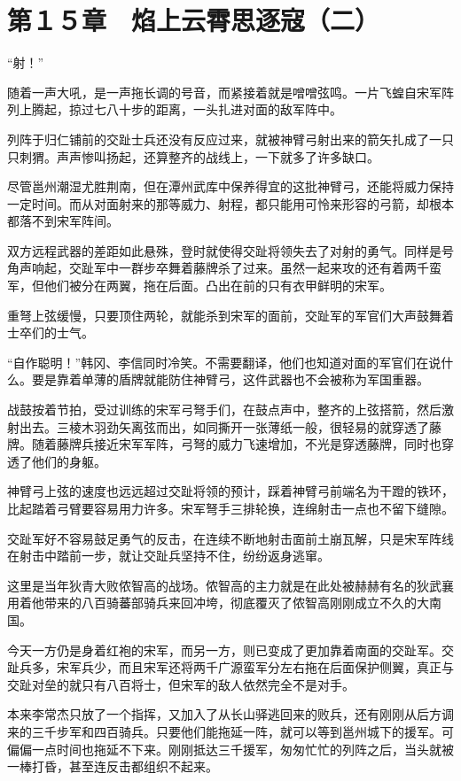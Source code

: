 \section{第１５章　焰上云霄思逐寇（二）}

“射！”

随着一声大吼，是一声拖长调的号音，而紧接着就是噌噌弦鸣。一片飞蝗自宋军阵列上腾起，掠过七八十步的距离，一头扎进对面的敌军阵中。

列阵于归仁铺前的交趾士兵还没有反应过来，就被神臂弓射出来的箭矢扎成了一只只刺猬。声声惨叫扬起，还算整齐的战线上，一下就多了许多缺口。

尽管邕州潮湿尤胜荆南，但在潭州武库中保养得宜的这批神臂弓，还能将威力保持一定时间。而从对面射来的那等威力、射程，都只能用可怜来形容的弓箭，却根本都落不到宋军阵间。

双方远程武器的差距如此悬殊，登时就使得交趾将领失去了对射的勇气。同样是号角声响起，交趾军中一群步卒舞着藤牌杀了过来。虽然一起来攻的还有着两千蛮军，但他们被分在两翼，拖在后面。凸出在前的只有衣甲鲜明的宋军。

重弩上弦缓慢，只要顶住两轮，就能杀到宋军的面前，交趾军的军官们大声鼓舞着士卒们的士气。

“自作聪明！”韩冈、李信同时冷笑。不需要翻译，他们也知道对面的军官们在说什么。要是靠着单薄的盾牌就能防住神臂弓，这件武器也不会被称为军国重器。

战鼓按着节拍，受过训练的宋军弓弩手们，在鼓点声中，整齐的上弦搭箭，然后激射出去。三棱木羽劲矢离弦而出，如同撕开一张薄纸一般，很轻易的就穿透了藤牌。随着藤牌兵接近宋军军阵，弓弩的威力飞速增加，不光是穿透藤牌，同时也穿透了他们的身躯。

神臂弓上弦的速度也远远超过交趾将领的预计，踩着神臂弓前端名为干蹬的铁环，比起踏着弓臂要容易用力许多。宋军弩手三排轮换，连绵射击一点也不留下缝隙。

交趾军好不容易鼓足勇气的反击，在连续不断地射击面前土崩瓦解，只是宋军阵线在射击中踏前一步，就让交趾兵坚持不住，纷纷返身逃窜。

这里是当年狄青大败侬智高的战场。侬智高的主力就是在此处被赫赫有名的狄武襄用着他带来的八百骑蕃部骑兵来回冲垮，彻底覆灭了侬智高刚刚成立不久的大南国。

今天一方仍是身着红袍的宋军，而另一方，则已变成了更加靠着南面的交趾军。交趾兵多，宋军兵少，而且宋军还将两千广源蛮军分左右拖在后面保护侧翼，真正与交趾对垒的就只有八百将士，但宋军的敌人依然完全不是对手。

本来李常杰只放了一个指挥，又加入了从长山驿逃回来的败兵，还有刚刚从后方调来的三千步军和四百骑兵。只要他们能拖延一阵，就可以等到邕州城下的援军。可偏偏一点时间也拖延不下来。刚刚抵达三千援军，匆匆忙忙的列阵之后，当头就被一棒打昏，甚至连反击都组织不起来。

